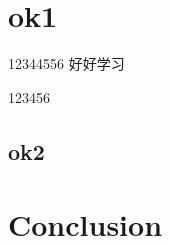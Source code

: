 \documentclass[UTF8,a4paper,sub3section]{ctexart}
\let\stdsection\section
\renewcommand\section{\newpage\stdsection}
\begin{document}
\section{ok1}
12344556 \cite{KEGG}
好好学习


123456
\subsection{ok2}
\section{ Conclusion }





\end{document}

